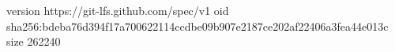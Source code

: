 version https://git-lfs.github.com/spec/v1
oid sha256:bdeba76d394f17a700622114ccdbe09b907e2187ce202af22406a3fea44e013c
size 262240
